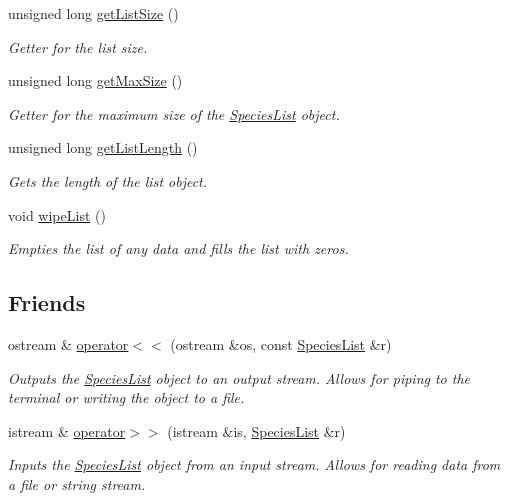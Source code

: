 \begin{DoxyCompactItemize}
unsigned long \hyperlink{class_species_list_acf5940a74565f570acbc9ae1f3b0d077}{get\+List\+Size} ()
\begin{DoxyCompactList}\small\item\em Getter for the list size. \end{DoxyCompactList}\item 
unsigned long \hyperlink{class_species_list_ad33e65584811dad38d0149bd057af628}{get\+Max\+Size} ()
\begin{DoxyCompactList}\small\item\em Getter for the maximum size of the \hyperlink{class_species_list}{Species\+List} object. \end{DoxyCompactList}\item 
unsigned long \hyperlink{class_species_list_a915e688365530f9fa39f0506c9b1c29f}{get\+List\+Length} ()
\begin{DoxyCompactList}\small\item\em Gets the length of the list object. \end{DoxyCompactList}\item 
void \hyperlink{class_species_list_acd0fd4ab7517523f04d8c37bb918d390}{wipe\+List} ()\hypertarget{class_species_list_acd0fd4ab7517523f04d8c37bb918d390}{}\label{class_species_list_acd0fd4ab7517523f04d8c37bb918d390}

\begin{DoxyCompactList}\small\item\em Empties the list of any data and fills the list with zeros. \end{DoxyCompactList}\end{DoxyCompactItemize}
\subsection*{Friends}
\begin{DoxyCompactItemize}
\item 
ostream \& \hyperlink{class_species_list_a307fffef634cd0a4615794ef7498cd4a}{operator$<$$<$} (ostream \&os, const \hyperlink{class_species_list}{Species\+List} \&r)
\begin{DoxyCompactList}\small\item\em Outputs the \hyperlink{class_species_list}{Species\+List} object to an output stream. Allows for piping to the terminal or writing the object to a file. \end{DoxyCompactList}\item 
istream \& \hyperlink{class_species_list_a2d74faa6012ce148a9f437249390c294}{operator$>$$>$} (istream \&is, \hyperlink{class_species_list}{Species\+List} \&r)
\begin{DoxyCompactList}\small\item\em Inputs the \hyperlink{class_species_list}{Species\+List} object from an input stream. Allows for reading data from a file or string stream. \end{DoxyCompactList}\end{DoxyCompactItemize}


